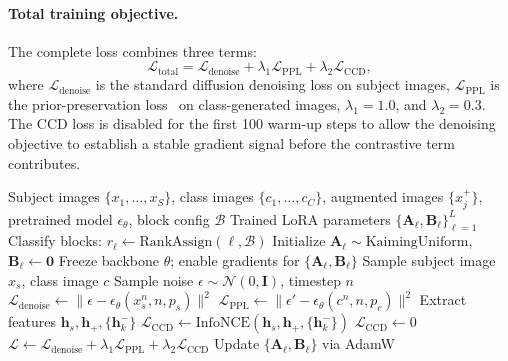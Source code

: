 \documentclass{article}
\begin{document}
\paragraph{Total training objective.}
The complete loss combines three terms:
\begin{equation}
    \mathcal{L}_{\text{total}} = \mathcal{L}_{\text{denoise}} + \lambda_1 \mathcal{L}_{\text{PPL}} + \lambda_2 \mathcal{L}_{\text{CCD}},
    \label{eq:total_loss}
\end{equation}
where $\mathcal{L}_{\text{denoise}}$ is the standard diffusion denoising loss on subject images, $\mathcal{L}_{\text{PPL}}$ is the prior-preservation loss~\citep{ruiz2023dreambooth} on class-generated images, $\lambda_1 = 1.0$, and $\lambda_2 = 0.3$.
The CCD loss is disabled for the first 100 warm-up steps to allow the denoising objective to establish a stable gradient signal before the contrastive term contributes.

\begin{algorithm}[t]
\caption{ModularBooth Training}
\label{alg:training}
\begin{algorithmic}[1]
\REQUIRE Subject images $\{x_1, \ldots, x_S\}$, class images $\{c_1, \ldots, c_C\}$, augmented images $\{x_j^+\}$, pretrained model $\epsilon_\theta$, block config $\mathcal{B}$
\ENSURE Trained LoRA parameters $\{\mathbf{A}_\ell, \mathbf{B}_\ell\}_{\ell=1}^L$
\STATE Classify blocks: $r_\ell \leftarrow \text{RankAssign}(\ell, \mathcal{B})$
\STATE Initialize $\mathbf{A}_\ell \sim \text{KaimingUniform}$, $\mathbf{B}_\ell \leftarrow \mathbf{0}$
\STATE Freeze backbone $\theta$; enable gradients for $\{\mathbf{A}_\ell, \mathbf{B}_\ell\}$
    \STATE Sample subject image $x_s$, class image $c$
    \STATE Sample noise $\epsilon \sim \mathcal{N}(0, \mathbf{I})$, timestep $n$
    \STATE $\mathcal{L}_{\text{denoise}} \leftarrow \|\epsilon - \epsilon_\theta(x_s^n, n, p_s)\|^2$
    \STATE $\mathcal{L}_{\text{PPL}} \leftarrow \|\epsilon' - \epsilon_\theta(c^n, n, p_c)\|^2$
        \STATE Extract features $\mathbf{h}_s, \mathbf{h}_+, \{\mathbf{h}_k^-\}$
        \STATE $\mathcal{L}_{\text{CCD}} \leftarrow \text{InfoNCE}(\mathbf{h}_s, \mathbf{h}_+, \{\mathbf{h}_k^-\})$
    \ELSE
        \STATE $\mathcal{L}_{\text{CCD}} \leftarrow 0$
    \ENDIF
    \STATE $\mathcal{L} \leftarrow \mathcal{L}_{\text{denoise}} + \lambda_1 \mathcal{L}_{\text{PPL}} + \lambda_2 \mathcal{L}_{\text{CCD}}$
    \STATE Update $\{\mathbf{A}_\ell, \mathbf{B}_\ell\}$ via AdamW
\ENDFOR
\end{algorithmic}
\end{algorithm}
\end{document}
